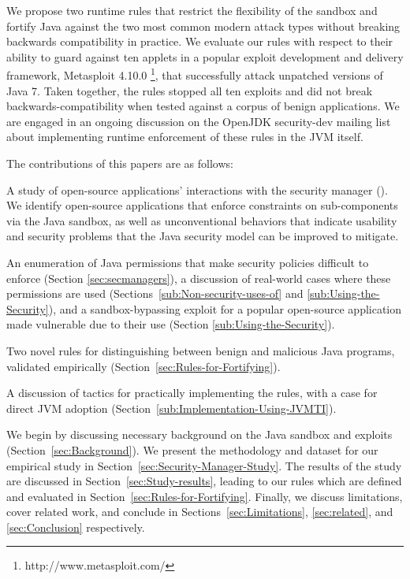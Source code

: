 \documentclass{sig-alternate}
\begin{document}
We propose
two runtime rules that restrict the flexibility of the sandbox and fortify Java
against the two most common modern attack types without breaking backwards
compatibility in practice. We evaluate our rules
with respect to their ability to guard against ten applets in a popular exploit development
and delivery framework, Metasploit
4.10.0%
\footnote{http://www.metasploit.com/}, that successfully attack unpatched
versions of Java 7.
Taken together, the rules stopped all ten exploits and did not break
backwards-compatibility
when tested against a corpus of benign applications.
We are engaged in an
ongoing discussion on the OpenJDK security-dev mailing list about
implementing runtime enforcement of these rules in the JVM itself.


The contributions of this papers are as follows:
\begin{flushitem} \setlength{\parskip}{0pt}
\setlength{\parsep}{0pt}
\setlength{\itemsep}{0pt}
\item A study of open-source applications' interactions with the security
manager ().  We identify open-source applications that
enforce constraints on sub-components via the Java sandbox,
as well as unconventional behaviors that indicate usability and security problems that the Java
security model can be improved to mitigate. 
\item An enumeration of Java permissions that make security policies difficult
to enforce (Section \ref{sec:secmanagers}), a discussion of real-world cases
where these permissions are used (Sections~\ref{sub:Non-security-uses-of} and
\ref{sub:Using-the-Security}), and a sandbox-bypassing exploit for a popular
open-source application made vulnerable due to their use (Section
\ref{sub:Using-the-Security}).
\item Two novel rules for distinguishing between benign and malicious Java
programs, validated empirically (Section~\ref{sec:Rules-for-Fortifying}).
\item A discussion of tactics for practically implementing the
rules, with a case for direct JVM adoption (Section~\ref{sub:Implementation-Using-JVMTI}).
\end{flushitem}

We begin by discussing necessary background on the Java sandbox and exploits
(Section~\ref{sec:Background}).  We present the methodology and  
dataset for our empirical study in Section~\ref{sec:Security-Manager-Study}. The
results of the study are discussed in  
Section~\ref{sec:Study-results}, leading to our rules which are defined and evaluated in 
Section~\ref{sec:Rules-for-Fortifying}. Finally, we discuss limitations, cover 
related work, and conclude in Sections~\ref{sec:Limitations}, \ref{sec:related}, and 
\ref{sec:Conclusion} respectively.
\end{document}
